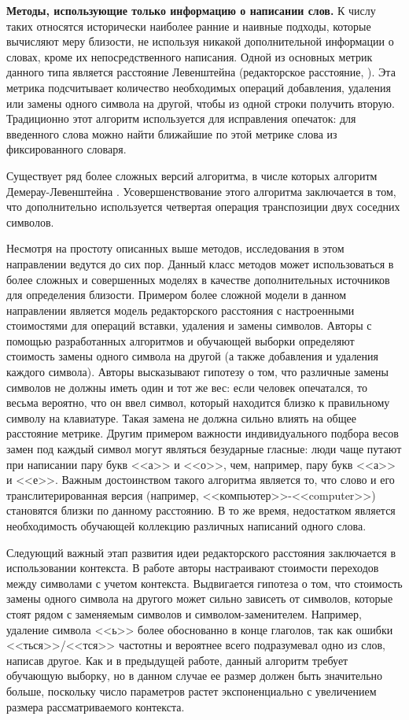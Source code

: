 \textbf{Методы, использующие только информацию о написании слов.} К числу таких относятся исторически наиболее ранние и наивные подходы, которые вычисляют меру близости, не используя никакой дополнительной информации о словах, кроме их непосредственного написания. Одной из основных метрик данного типа является расстояние Левенштейна  (редакторское расстояние, \cite{leven}). Эта метрика подсчитывает количество необходимых операций добавления, удаления или замены одного символа на другой, чтобы из одной строки получить вторую. Традиционно этот алгоритм используется для исправления опечаток: для введенного слова можно найти ближайшие по этой метрике слова из фиксированного словаря. 

Существует ряд более сложных версий алгоритма, в числе которых алгоритм Демерау-Левенштейна \cite{leven_dem}. Усовершенствование этого алгоритма заключается в том, что дополнительно используется четвертая операция транспозиции двух соседних символов.

Несмотря на простоту описанных выше методов, исследования в этом направлении ведутся до сих пор. Данный класс методов может использоваться в более сложных и совершенных моделях в качестве дополнительных источников для определения близости. Примером более сложной модели в данном направлении является модель редакторского расстояния с настроенными стоимостями для операций вставки, удаления и замены символов.
Авторы \cite{learn_leven} с помощью разработанных алгоритмов и обучающей выборки определяют стоимость замены одного символа на другой (а также добавления и удаления каждого символа). Авторы высказывают гипотезу о том, что различные замены символов не должны иметь один и тот же вес: если человек опечатался, то весьма вероятно, что он ввел символ, который находится близко к правильному символу на клавиатуре. Такая замена не должна сильно влиять на общее расстояние метрике. Другим примером важности индивидуального подбора весов замен под каждый символ могут являться безударные гласные: люди чаще путают при написании пару букв <<а>> и <<о>>, чем, например, пару букв <<а>> и <<е>>. Важным достоинством такого алгоритма является то, что слово и его транслитерированная версия (например, <<компьютер>>-<<computer>>) становятся близки по данному расстоянию. В то же время, недостатком является необходимость обучающей коллекцию различных написаний одного слова.

Следующий важный этап развития идеи редакторского расстояния заключается в использовании контекста. В работе \cite{context_leven} авторы настраивают стоимости переходов между символами с учетом контекста. Выдвигается гипотеза о том, что стоимость замены одного символа на другого может сильно зависеть от символов, которые стоят рядом с заменяемым символов и символом-заменителем. Например, удаление символа <<ь>> более обоснованно в конце глаголов, так как ошибки <<ться>>/<<тся>> частотны и вероятнее всего подразумевал одно из слов, написав другое. Как и в предыдущей работе, данный алгоритм требует обучающую выборку, но в данном случае ее размер должен быть значительно больше, поскольку число параметров растет экспоненциально с увеличением размера рассматриваемого контекста.

